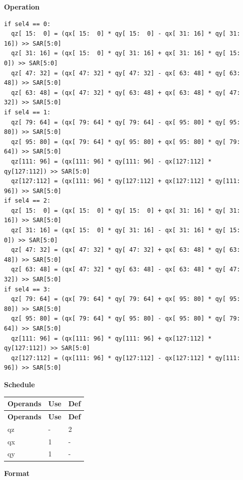 \textbf{Operation}\\
\begin{lstlisting}
if sel4 == 0:
  qz[ 15:  0] = (qx[ 15:  0] * qy[ 15:  0] - qx[ 31: 16] * qy[ 31: 16]) >> SAR[5:0]
  qz[ 31: 16] = (qx[ 15:  0] * qy[ 31: 16] + qx[ 31: 16] * qy[ 15:  0]) >> SAR[5:0]
  qz[ 47: 32] = (qx[ 47: 32] * qy[ 47: 32] - qx[ 63: 48] * qy[ 63: 48]) >> SAR[5:0]
  qz[ 63: 48] = (qx[ 47: 32] * qy[ 63: 48] + qx[ 63: 48] * qy[ 47: 32]) >> SAR[5:0]
if sel4 == 1:
  qz[ 79: 64] = (qx[ 79: 64] * qy[ 79: 64] - qx[ 95: 80] * qy[ 95: 80]) >> SAR[5:0]
  qz[ 95: 80] = (qx[ 79: 64] * qy[ 95: 80] + qx[ 95: 80] * qy[ 79: 64]) >> SAR[5:0]
  qz[111: 96] = (qx[111: 96] * qy[111: 96] - qx[127:112] * qy[127:112]) >> SAR[5:0]
  qz[127:112] = (qx[111: 96] * qy[127:112] + qx[127:112] * qy[111: 96]) >> SAR[5:0]
if sel4 == 2:
  qz[ 15:  0] = (qx[ 15:  0] * qy[ 15:  0] + qx[ 31: 16] * qy[ 31: 16]) >> SAR[5:0]
  qz[ 31: 16] = (qx[ 15:  0] * qy[ 31: 16] - qx[ 31: 16] * qy[ 15:  0]) >> SAR[5:0]
  qz[ 47: 32] = (qx[ 47: 32] * qy[ 47: 32] + qx[ 63: 48] * qy[ 63: 48]) >> SAR[5:0]
  qz[ 63: 48] = (qx[ 47: 32] * qy[ 63: 48] - qx[ 63: 48] * qy[ 47: 32]) >> SAR[5:0]
if sel4 == 3:
  qz[ 79: 64] = (qx[ 79: 64] * qy[ 79: 64] + qx[ 95: 80] * qy[ 95: 80]) >> SAR[5:0]
  qz[ 95: 80] = (qx[ 79: 64] * qy[ 95: 80] - qx[ 95: 80] * qy[ 79: 64]) >> SAR[5:0]
  qz[111: 96] = (qx[111: 96] * qy[111: 96] + qx[127:112] * qy[127:112]) >> SAR[5:0]
  qz[127:112] = (qx[111: 96] * qy[127:112] - qx[127:112] * qy[111: 96]) >> SAR[5:0]
\end{lstlisting}



\textbf{Schedule}\\
\begin{longtable}[c]{|l|l|l|}
    \hline
    \rowcolor{lightgray}
    \textbf{Operands} & \textbf{Use} & \textbf{Def} \\\hline
    \endfirsthead
    \hline
    \rowcolor{lightgray}
     \textbf{Operands} & \textbf{Use} & \textbf{Def} \\\hline
    \endhead
    \hline
    \endfoot


    qz & - & 2 \\\hline
     qx & 1 & - \\\hline
     qy & 1 & -

\end{longtable}

\textbf{Format}\\

